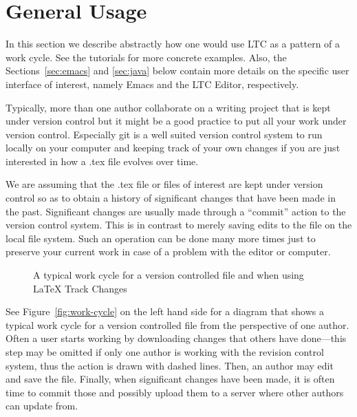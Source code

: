 \section{General Usage} \label{sec:general-use}
\newcommand{\generalscale}{0.9}  %

In this section we describe abstractly how one would use LTC as a pattern of a work cycle. See the tutorials for more concrete examples.  Also, the Sections~\ref{sec:emacs} and \ref{sec:java} below contain more details on the specific user interface of interest, namely Emacs and the LTC Editor, respectively.

Typically, more than one author collaborate on a writing project that is kept under version control but it might be a good practice to put all your work under version control.  Especially git is a well suited version control system to run locally on your computer and keeping track of your own changes if you are just interested in how a .tex file evolves over time.

We are assuming that the .tex file or files of interest are kept under version control so as to obtain a history of significant changes that have been made in the past.  Significant changes are usually made through a ``commit'' action to the version control system.  This is in contrast to merely saving edits to the file on the local file system.  Such an operation can be done many more times just to preserve your current work in case of a problem with the editor or computer.

\begin{figure}[t]
\centering
  \hfill %
\caption{A typical work cycle for a version controlled file and when using LaTeX Track Changes} \label{fig:work-cycle}
\label{fig:editor-condense-before-after}
\end{figure}

See Figure~\ref{fig:work-cycle} on the left hand side for a diagram that shows a typical work cycle for a version controlled file from the perspective of one author.  Often a user starts working by downloading changes that others have done---this step may be omitted if only one author is working with the revision control system, thus the action is drawn with dashed lines.  Then, an author may edit and save the file.  Finally, when significant changes have been made, it is often time to commit those and possibly upload them to a server where other authors can update from.

